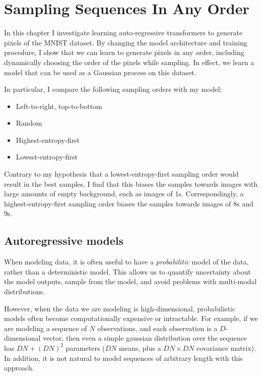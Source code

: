 \chapter{Sampling Sequences In Any Order}
\label{C:a-o-sampling}

In this chapter I investigate learning auto-regressive transformers to generate pixels of the MNIST dataset. By changing the model architecture and training procedure, I show that we can learn to generate pixels in any order, including dynamically choosing the order of the pixels while sampling. In effect, we learn a model that can be used as a Gaussian process on this dataset.

In particular, I compare the following sampling orders with my model:
\begin{itemize}
    \item Left-to-right, top-to-bottom
    \item Random
    \item Highest-entropy-first
    \item Lowest-entropy-first
\end{itemize}

Contrary to my hypothesis that a lowest-entropy-first sampling order would result in the best samples, I find that this biases the samples towards images with large amounts of empty background, such as images of 1s. Correspondingly, a highest-entropy-first sampling order biases the samples towards images of 8s and 9s.

\section{Autoregressive models}

When modeling data, it is often useful to have a \textit{probabilitic} model of the data, rather than a deterministic model. This allows us to quantify uncertainty about the model outputs, sample from the model, and avoid problems with multi-modal distributions.

However, when the data we are modeling is high-dimensional, probabilistic models often become computationally expensive or intractable. For example, if we are modeling a sequence of $N$ observations, and each observation is a $D$-dimensional vector, then even a simple gaussian distribution over the  sequence has $DN + (DN)^2$ parameters ($DN$ means, plus a $DN \times DN$ covariance matrix). In addition, it is not natural to model sequences of arbitrary length with this approach.

